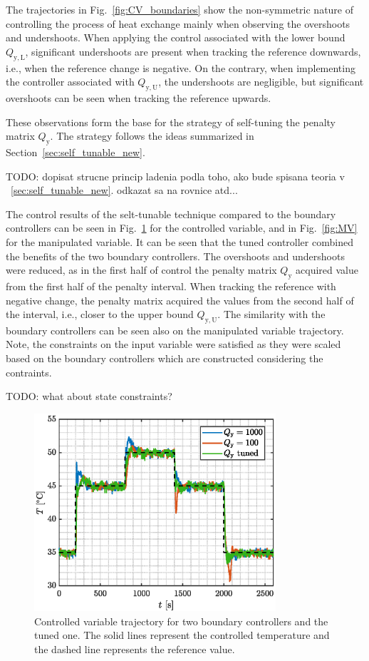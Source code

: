 \documentclass[preprint,12pt]{elsarticle}
\begin{document}
The trajectories in Fig.~\ref{fig:CV_boundaries} show the non-symmetric nature of controlling the process of heat exchange mainly when observing the overshoots and undershoots. When applying the control associated with the lower bound $Q_\mathrm{y, L}$, significant undershoots are present when tracking the reference downwards, i.e., when the reference change is negative. On the contrary, when implementing the controller associated with $Q_\mathrm{y, U}$, the undershoots are negligible, but significant overshoots can be seen when tracking the reference upwards.

These observations form the base for the strategy of self-tuning the penalty matrix $Q_\mathrm{y}$. The strategy follows the ideas summarized in Section~\ref{sec:self_tunable_new}.

TODO: dopisat strucne princip ladenia podla toho, ako bude spisana teoria v ~\ref{sec:self_tunable_new}. odkazat sa na rovnice atd...

The control results of the selt-tunable technique compared to the boundary controllers can be seen in Fig.~\ref{fig:CV} for the controlled variable, and in Fig.~\ref{fig:MV} for the manipulated variable. It can be seen that the tuned controller combined the benefits of the two boundary controllers. The overshoots and undershoots were reduced, as in the first half of control the penalty matrix $Q_\mathrm{y}$ acquired value from the first half of the penalty interval. When tracking the reference with negative change, the penalty matrix acquired the values from the second half of the interval, i.e., closer to the upper bound $Q_\mathrm{y,U}$. 
The similarity with the boundary controllers can be seen also on the manipulated variable trajectory. Note, the constraints on the input variable were satisfied as they were scaled based on the boundary controllers which are constructed considering the contraints. 

TODO: what about state constraints?


\begin{figure}
	\begin{center}
		\includegraphics[width=0.8\textwidth]{images/CV}
		\caption{Controlled variable trajectory for two boundary controllers and the tuned one. The solid lines represent the controlled temperature and the dashed line represents the reference value.}
		\label{fig:CV}
	\end{center}
\end{figure}
\end{document}
